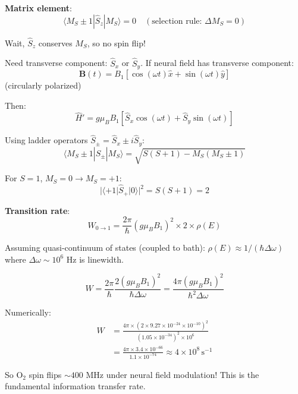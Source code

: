 \documentclass[11pt,onecolumn]{article}
\begin{document}
\textbf{Matrix element}:
\begin{equation}
\langle M_S \pm 1 | \hat{S}_z | M_S \rangle = 0 \quad (\text{selection rule: } \Delta M_S = 0)
\end{equation}

Wait, $\hat{S}_z$ conserves $M_S$, so no spin flip!

Need transverse component: $\hat{S}_x$ or $\hat{S}_y$. If neural field has transverse component:
\begin{equation}
\mathbf{B}(t) = B_1[\cos(\omega t)\hat{x} + \sin(\omega t)\hat{y}]
\end{equation}
(circularly polarized)

Then:
\begin{equation}
\hat{H}' = g\mu_B B_1[\hat{S}_x \cos(\omega t) + \hat{S}_y \sin(\omega t)]
\end{equation}

Using ladder operators $\hat{S}_\pm = \hat{S}_x \pm i\hat{S}_y$:
\begin{equation}
\langle M_S \pm 1 | \hat{S}_\pm | M_S \rangle = \sqrt{S(S+1) - M_S(M_S \pm 1)}
\end{equation}

For $S=1$, $M_S = 0 \to M_S = +1$:
\begin{equation}
|\langle +1 | \hat{S}_+ | 0 \rangle|^2 = S(S+1) = 2
\end{equation}

\textbf{Transition rate}:
\begin{equation}
W_{0 \to 1} = \frac{2\pi}{\hbar}(g\mu_B B_1)^2 \times 2 \times \rho(E)
\end{equation}

Assuming quasi-continuum of states (coupled to bath): $\rho(E) \approx 1/(\hbar\Delta\omega)$ where $\Delta\omega \sim 10^6$ Hz is linewidth.

\begin{equation}
W = \frac{2\pi}{\hbar}\frac{2(g\mu_B B_1)^2}{\hbar\Delta\omega} = \frac{4\pi(g\mu_B B_1)^2}{\hbar^2 \Delta\omega}
\end{equation}

Numerically:
\begin{align}
W &= \frac{4\pi \times (2 \times 9.27 \times 10^{-24} \times 10^{-10})^2}{(1.05 \times 10^{-34})^2 \times 10^6} \\
&= \frac{4\pi \times 3.4 \times 10^{-66}}{1.1 \times 10^{-74}} \approx 4 \times 10^8\,\text{s}^{-1}
\end{align}

So O$_2$ spin flips $\sim 400$ MHz under neural field modulation! This is the fundamental information transfer rate.
\end{document}
